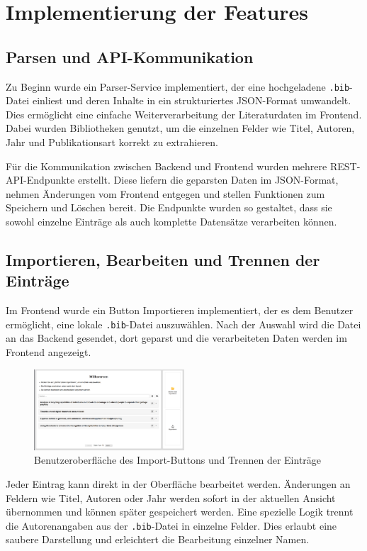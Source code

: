 \section{Implementierung der Features}

\subsection{Parsen und API-Kommunikation}
Zu Beginn wurde ein Parser-Service implementiert, der eine hochgeladene \texttt{.bib}-Datei einliest 
und deren Inhalte in ein strukturiertes JSON-Format umwandelt. Dies ermöglicht eine einfache Weiterverarbeitung 
der Literaturdaten im Frontend. Dabei wurden Bibliotheken genutzt, um die einzelnen Felder wie Titel, Autoren, Jahr
und Publikationsart korrekt zu extrahieren.

Für die Kommunikation zwischen Backend und Frontend wurden mehrere REST-API-Endpunkte erstellt.
Diese liefern die geparsten Daten im JSON-Format, nehmen Änderungen vom Frontend entgegen und
stellen Funktionen zum Speichern und Löschen bereit. Die Endpunkte wurden so gestaltet, dass sie sowohl
einzelne Einträge als auch komplette Datensätze verarbeiten können.

\subsection{Importieren, Bearbeiten und Trennen der Einträge}
Im Frontend wurde ein Button \glqq Importieren\grqq{} implementiert, der es dem Benutzer ermöglicht,
eine lokale \texttt{.bib}-Datei auszuwählen. Nach der Auswahl wird die Datei an das Backend gesendet, 
dort geparst und die verarbeiteten Daten werden im Frontend angezeigt.

\begin{figure}[h]
    \centering
    \includegraphics[width=0.5\textwidth]{Graphics/front.png}
    \caption{Benutzeroberfläche des Import-Buttons und Trennen der Einträge}
    \label{fig:importieren}
\end{figure}

Jeder Eintrag kann direkt in der Oberfläche bearbeitet werden. Änderungen an Feldern wie Titel,
Autoren oder Jahr werden sofort in der aktuellen Ansicht übernommen und können später gespeichert werden.
Eine spezielle Logik trennt die Autorenangaben aus der \texttt{.bib}-Datei in einzelne Felder.
Dies erlaubt eine saubere Darstellung und erleichtert die Bearbeitung einzelner Namen.

